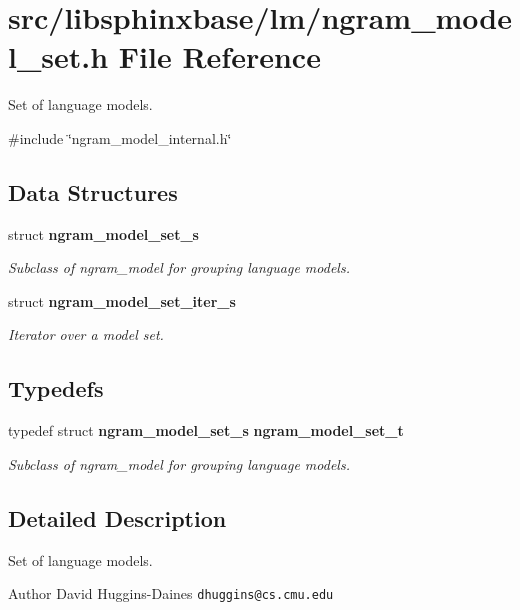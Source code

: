 \section{src/libsphinxbase/lm/ngram\+\_\+model\+\_\+set.h File Reference}
\label{ngram__model__set_8h}


Set of language models.  


{\ttfamily \#include \char`\"{}ngram\+\_\+model\+\_\+internal.\+h\char`\"{}}\newline
\subsection*{Data Structures}
\begin{DoxyCompactItemize}
\item 
struct \textbf{ ngram\+\_\+model\+\_\+set\+\_\+s}
\begin{DoxyCompactList}\small\item\em Subclass of ngram\+\_\+model for grouping language models. \end{DoxyCompactList}\item 
struct \textbf{ ngram\+\_\+model\+\_\+set\+\_\+iter\+\_\+s}
\begin{DoxyCompactList}\small\item\em Iterator over a model set. \end{DoxyCompactList}\end{DoxyCompactItemize}
\subsection*{Typedefs}
\begin{DoxyCompactItemize}
\item 
\mbox{\label{ngram__model__set_8h_af89b4060ed18e3f4e3ac0490a09d5745}} 
typedef struct \textbf{ ngram\+\_\+model\+\_\+set\+\_\+s} \textbf{ ngram\+\_\+model\+\_\+set\+\_\+t}
\begin{DoxyCompactList}\small\item\em Subclass of ngram\+\_\+model for grouping language models. \end{DoxyCompactList}\end{DoxyCompactItemize}


\subsection{Detailed Description}
Set of language models. 

\begin{DoxyAuthor}{Author}
David Huggins-\/\+Daines {\tt dhuggins@cs.\+cmu.\+edu} 
\end{DoxyAuthor}
